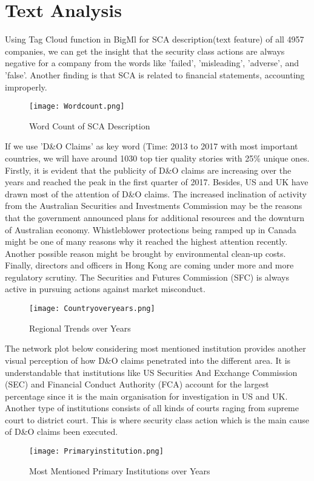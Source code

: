 \section{Text Analysis}
Using Tag Cloud function in BigMl for SCA description(text feature) of all 4957 companies, we can get the insight that the security class actions are always negative for a company from the words like 'failed', 'misleading', 'adverse', and 'false'. Another finding is that SCA is related to financial statements, accounting improperly.
\begin{figure}[H]
  \centering
  \texttt{[image: Wordcount.png]}
  \caption{Word Count of SCA Description}
\end{figure}
\indent If we use 'D\&O Claims' as key word (Time: 2013 to 2017 with most important countries, we will have around 1030 top tier quality stories with 25\% unique ones. Firstly, it is evident that the publicity of D\&O claims are increasing over the years and reached the peak in the first quarter of 2017. Besides, US and UK have drawn most of the attention of D\&O claims. The increased inclination of activity from the Australian Securities and Investments Commission may be the reasons that the government announced plans for additional resources and the downturn of Australian economy. Whistleblower protections being ramped up in Canada might be one of many reasons why it reached the highest attention recently. Another possible reason might be brought by environmental clean-up costs. Finally, directors and officers in Hong Kong are coming under more and more regulatory scrutiny. The Securities and Futures Commission (SFC) is always active in pursuing actions against market misconduct.\\
\begin{figure}[H]
  \centering
  \texttt{[image: Countryoveryears.png]}
  \caption{Regional Trends over Years}
\end{figure}
The network plot below considering most mentioned institution provides another visual perception of how D\&O claims penetrated into the different area. It is understandable that institutions like US Securities And Exchange Commission (SEC) and Financial Conduct Authority (FCA) account for the largest percentage since it is the main organisation for investigation in US and UK. Another type of institutions consists of all kinds of courts raging from supreme court to district court. This is where security class action which is the main cause of D\&O claims been executed. 
\begin{figure}[H]
  \centering
  \texttt{[image: Primaryinstitution.png]}
  \caption{Most Mentioned Primary Institutions over Years}
\end{figure}
